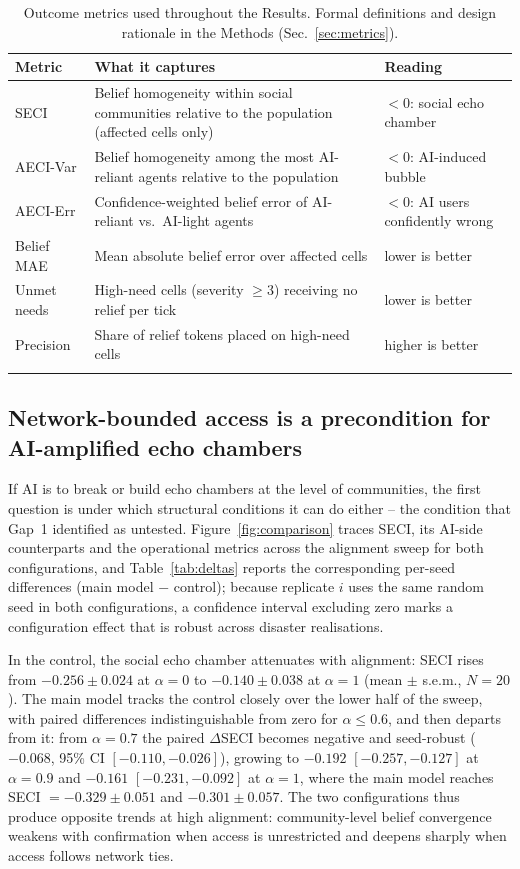 \documentclass[pdflatex,sn-nature]{sn-jnl}
\begin{document}
\begin{table}[h]
\caption{Outcome metrics used throughout the Results. Formal definitions and design rationale in the Methods (Sec.~\ref{sec:metrics}).}\label{tab:metrics}
\footnotesize
\begin{tabular}{@{}lp{6.6cm}l@{}}
\toprule
Metric & What it captures & Reading \\
\midrule
SECI & Belief homogeneity within social communities relative to the population (affected cells only) & $<0$: social echo chamber \\
AECI-Var & Belief homogeneity among the most AI-reliant agents relative to the population & $<0$: AI-induced bubble \\
AECI-Err & Confidence-weighted belief error of AI-reliant vs.\ AI-light agents & $<0$: AI users confidently wrong \\
Belief MAE & Mean absolute belief error over affected cells & lower is better \\
Unmet needs & High-need cells (severity $\geq 3$) receiving no relief per tick & lower is better \\
Precision & Share of relief tokens placed on high-need cells & higher is better \\
\botrule
\end{tabular}
\end{table}

\subsection{Network-bounded access is a precondition for AI-amplified echo chambers}\label{sec:claim1}

If AI is to break or build echo chambers at the level of communities, the first question is under which structural conditions it can do either -- the condition that Gap~1 identified as untested. Figure~\ref{fig:comparison} traces SECI, its AI-side counterparts and the operational metrics across the alignment sweep for both configurations, and Table~\ref{tab:deltas} reports the corresponding per-seed differences (main model $-$ control); because replicate $i$ uses the same random seed in both configurations, a confidence interval excluding zero marks a configuration effect that is robust across disaster realisations.

In the control, the social echo chamber attenuates with alignment: SECI rises from $-0.256 \pm 0.024$ at $\alpha = 0$ to $-0.140 \pm 0.038$ at $\alpha = 1$ (mean $\pm$ s.e.m., $N = 20$). The main model tracks the control closely over the lower half of the sweep, with paired differences indistinguishable from zero for $\alpha \leq 0.6$, and then departs from it: from $\alpha = 0.7$ the paired $\Delta$SECI becomes negative and seed-robust ($-0.068$, 95\% CI $[-0.110, -0.026]$), growing to $-0.192$ $[-0.257, -0.127]$ at $\alpha = 0.9$ and $-0.161$ $[-0.231, -0.092]$ at $\alpha = 1$, where the main model reaches SECI $= -0.329 \pm 0.051$ and $-0.301 \pm 0.057$. The two configurations thus produce opposite trends at high alignment: community-level belief convergence weakens with confirmation when access is unrestricted and deepens sharply when access follows network ties.
\end{document}

